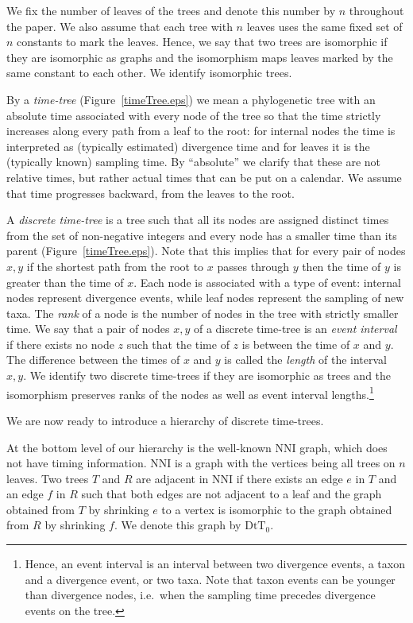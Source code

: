 \documentclass[11pt]{amsart}
\theoremstyle{definition}
\newcommand{\nni}{\mathrm{NNI}}
\newcommand{\dtt}{\mathrm{DtT}}
\begin{document}
We fix the number of leaves of the trees and denote this number by $n$ throughout the paper.
We also assume that each tree with $n$ leaves uses the same fixed set of $n$ constants to mark the leaves.
Hence, we say that two trees are isomorphic if they are isomorphic as graphs and the isomorphism maps leaves marked by the same constant to each other.
We identify isomorphic trees.

By a \emph{time-tree} (Figure~\ref{timeTree.eps}) we mean a phylogenetic tree with an absolute time associated with every node of the tree so that the time strictly increases along every path from a leaf to the root: for internal nodes the time is interpreted as (typically estimated) divergence time and for leaves it is the (typically known) sampling time.
By ``absolute'' we clarify that these are not relative times, but rather actual times that can be put on a calendar.
We assume that time progresses backward, from the leaves to the root.

A \emph{discrete time-tree} is a tree such that all its nodes are assigned distinct times from the set of non-negative integers and every node has a smaller time than its parent (Figure~\ref{timeTree.eps}).
Note that this implies that for every pair of nodes $x,y$ if the shortest path from the root to $x$ passes through $y$ then the time of $y$ is greater than the time of $x$.
Each node is associated with a type of event: internal nodes represent divergence events, while leaf nodes represent the sampling of new taxa.
The \emph{rank} of a node is the number of nodes in the tree with strictly smaller time.
We say that a pair of nodes $x,y$ of a discrete time-tree is an \emph{event interval} if there exists no node $z$ such that the time of $z$ is between the time of $x$ and $y$.
The difference between the times of $x$ and $y$ is called the \emph{length} of the interval $x,y$.
We identify two discrete time-trees if they are isomorphic as trees and the isomorphism preserves ranks of the nodes as well as event interval lengths.\footnote{
Hence, an event interval is an interval between two divergence events, a taxon and a divergence event, or two taxa.
Note that taxon events can be younger than divergence nodes, i.e.\ when the sampling time precedes divergence events on the tree.}

We are now ready to introduce a hierarchy of discrete time-trees.

At the bottom level of our hierarchy is the well-known $\nni$ graph, which does not have timing information.
$\nni$ is a graph with the vertices being all trees on $n$ leaves.
Two trees $T$ and $R$ are adjacent in $\nni$ if there exists an edge $e$ in $T$ and an edge $f$ in $R$ such that both edges are not adjacent to a leaf and the graph obtained from $T$ by shrinking $e$ to a vertex is isomorphic to the graph obtained from $R$ by shrinking $f$.
We denote this graph by $\dtt_0$.
\end{document}
